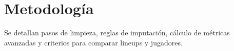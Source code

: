 \chapter{Metodología}

Se detallan pasos de limpieza, reglas de imputación, cálculo de métricas avanzadas y criterios para comparar lineups y jugadores.
